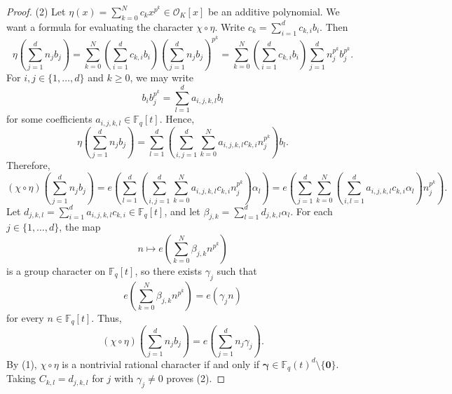 \documentclass{amsart}
\theoremstyle{definition}
\numberwithin{equation}{section}
\newcommand{\F}{\mathbb{F}}
\newcommand{\mO}{\mathcal{O}}
\begin{document}
\begin{proof}
   (2)
   Let $\eta(x) = \sum_{k=0}^N c_k x^{p^k} \in \mO_K[x]$ be an additive polynomial.
   We want a formula for evaluating the character $\chi \circ \eta$.
   Write $c_k = \sum_{i=1}^d c_{k,i} b_i$.
   Then
   \begin{equation*}
       \eta \left( \sum_{j=1}^d n_j b_j \right) = \sum_{k=0}^N \left( \sum_{i=1}^d c_{k,i} b_i \right) \left( \sum_{j=1}^d n_j b_j \right)^{p^k}
       = \sum_{k=0}^N \left( \sum_{i=1}^d c_{k,i} b_i \right) \sum_{j=1}^d n_j^{p^k} b_j^{p^k}.
   \end{equation*}
   For $i, j \in \{1, \ldots, d\}$ and $k \ge 0$, we may write
   \begin{equation*}
       b_i b_j^{p^k} = \sum_{l=1}^d a_{i,j,k,l} b_l
   \end{equation*}
   for some coefficients $a_{i,j,k,l} \in \F_q[t]$.
   Hence,
   \begin{equation*}
       \eta \left( \sum_{j=1}^d n_j b_j \right) = \sum_{l=1}^d \left( \sum_{i,j=1}^d \sum_{k=0}^N a_{i,j,k,l} c_{k,i} n_j^{p^k} \right) b_l.
   \end{equation*}
   Therefore,
   \begin{equation*}
       (\chi \circ \eta) \left( \sum_{j=1}^d n_j b_j \right) = e \left( \sum_{l=1}^d \left( \sum_{i,j=1}^d \sum_{k=0}^N a_{i,j,k,l} c_{k,i} n_j^{p^k} \right) \alpha_l \right)
       = e \left( \sum_{j=1}^d \sum_{k=0}^N \left( \sum_{i,l=1}^d a_{i,j,k,l} c_{k,i} \alpha_l \right) n_j^{p^k} \right).
   \end{equation*}
   Let $d_{j,k,l} = \sum_{i=1}^d a_{i,j,k,l} c_{k,i} \in \F_q[t]$, and let $\beta_{j,k} = \sum_{l=1}^d d_{j,k,l} \alpha_l$.
   For each $j \in \{1, \ldots, d\}$, the map
   \begin{equation*}
       n \mapsto e\left( \sum_{k=0}^N \beta_{j,k} n^{p^k} \right)
   \end{equation*}
   is a group character on $\F_q[t]$, so there exists $\gamma_j$ such that
   \begin{equation*}
       e\left( \sum_{k=0}^N \beta_{j,k} n^{p^k} \right) = e(\gamma_j n)
   \end{equation*}
   for every $n \in \F_q[t]$.
   Thus,
   \begin{equation*}
       (\chi \circ \eta) \left( \sum_{j=1}^d n_j b_j \right) = e \left( \sum_{j=1}^d n_j \gamma_j \right).
   \end{equation*}
   By (1), $\chi \circ \eta$ is a nontrivial rational character if and only if $\bm{\gamma} \in \F_q(t)^d \setminus \{\bm{0}\}$.
   Taking $C_{k,l} = d_{j,k,l}$ for $j$ with $\gamma_j \ne 0$ proves (2).
\end{proof}
\end{document}
